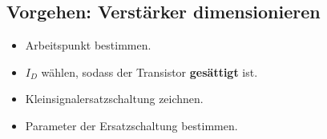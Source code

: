 \subsection{Vorgehen: Verstärker dimensionieren}
\begin{itemize}
    \item Arbeitspunkt bestimmen.
    \item $I_D$ wählen, sodass der Transistor \textbf{gesättigt} ist.   %
    \item Kleinsignalersatzschaltung zeichnen.
    \item Parameter der Ersatzschaltung bestimmen.
\end{itemize}